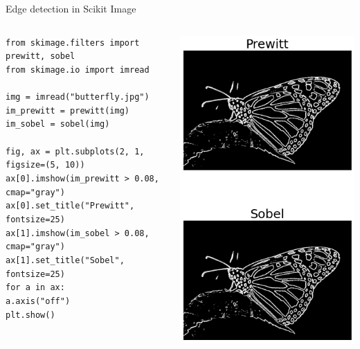 \documentclass[9pt, aspectratio=169]{beamer}
\begin{document}
\begin{frame}
    {Edge detection in Scikit Image}
    \begin{columns}
    \begin{column}{.6\textwidth}
        \begin{codebox}
            \texttt{from skimage.filters import prewitt, sobel\\
                from skimage.io import imread\\
                \\
                img = imread("butterfly.jpg")\\
                im\_prewitt = prewitt(img)\\
                im\_sobel = sobel(img)\\
                \pause
                \\
                fig, ax = plt.subplots(2, 1, figsize=(5, 10))\\
                ax[0].imshow(im\_prewitt > 0.08, cmap="gray")\\
                ax[0].set\_title("Prewitt", fontsize=25)\\
                ax[1].imshow(im\_sobel > 0.08, cmap="gray")\\
                ax[1].set\_title("Sobel", fontsize=25)\\
                for a in ax:\\
                a.axis("off")\\
                plt.show()}
        \end{codebox}        
    \end{column}
    \begin{column}{.4\textwidth}
        \includegraphics[width=.7\textwidth]{monarch_prewitt_sobel.png}

\end{column}
\end{columns}
\end{frame}
\end{document}
